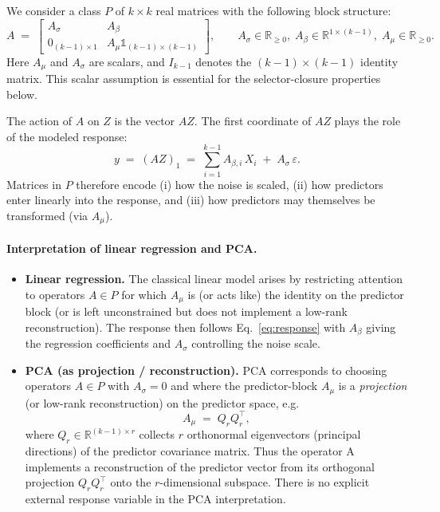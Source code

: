 \begin{defn} We consider a class \(P\) of \(k\times k\) real matrices with the following block structure:
\begin{equation} \label{eq:block-A}
A \;=\;
\begin{bmatrix}
A_\sigma & A_\beta \\[4pt]
0_{(k-1)\times 1} & A_\mu \mathbb{1}_{(k-1)\times(k-1)}
\end{bmatrix},
\qquad
A_\sigma \in \mathbb{R}_{\geq 0},\;
A_\beta \in \mathbb{R}^{1\times (k-1)},\;
A_\mu \in \mathbb{R}_{\geq 0}.
\end{equation}
Here $A_\mu$ and $A_\sigma$ are scalars, and $I_{k-1}$ denotes the $(k-1) \times (k-1)$ identity matrix. This scalar assumption is essential for the selector-closure properties below. 

The action of \(A\) on \(Z\) is the vector \(AZ\). The first coordinate of \(AZ\) plays the role of the modeled response:
\begin{equation} \label{eq:response}
y \;=\; (AZ)_{1}
\;=\; \sum_{i=1}^{k-1} A_{\beta,i}\, X_i \;+\; A_\sigma\,\varepsilon.
\end{equation}
Matrices in \(P\) therefore encode (i) how the noise is scaled, (ii) how predictors enter linearly into the response, and (iii) how predictors may themselves be transformed (via \(A_\mu\)).
\end{defn}

\paragraph{Interpretation of linear regression and PCA.}
\begin{itemize}
  \item \textbf{Linear regression.} The classical linear model arises by restricting attention to operators \(A\in P\) for which \(A_\mu\) is (or acts like) the identity on the predictor block (or is left unconstrained but does not implement a low-rank reconstruction). The response then follows Eq.~\eqref{eq:response} with \(A_\beta\) giving the regression coefficients and \(A_\sigma\) controlling the noise scale.
  \item \textbf{PCA (as projection / reconstruction).} PCA corresponds to choosing operators \(A\in P\) with \(A_\sigma=0\) and where the predictor-block \(A_\mu\) is a \emph{projection} (or low-rank reconstruction) on the predictor space, e.g.
  \[
  A_\mu \;=\; Q_r Q_r^\top,
  \]
  where \(Q_r\in\mathbb{R}^{(k-1)\times r}\) collects \(r\) orthonormal eigenvectors (principal directions) of the predictor covariance matrix. Thus the operator A implements a reconstruction of the predictor vector from its orthogonal projection $Q_r Q_r^\top$ onto the $r$-dimensional subspace. There is no explicit external response variable in the PCA interpretation.
\end{itemize}

